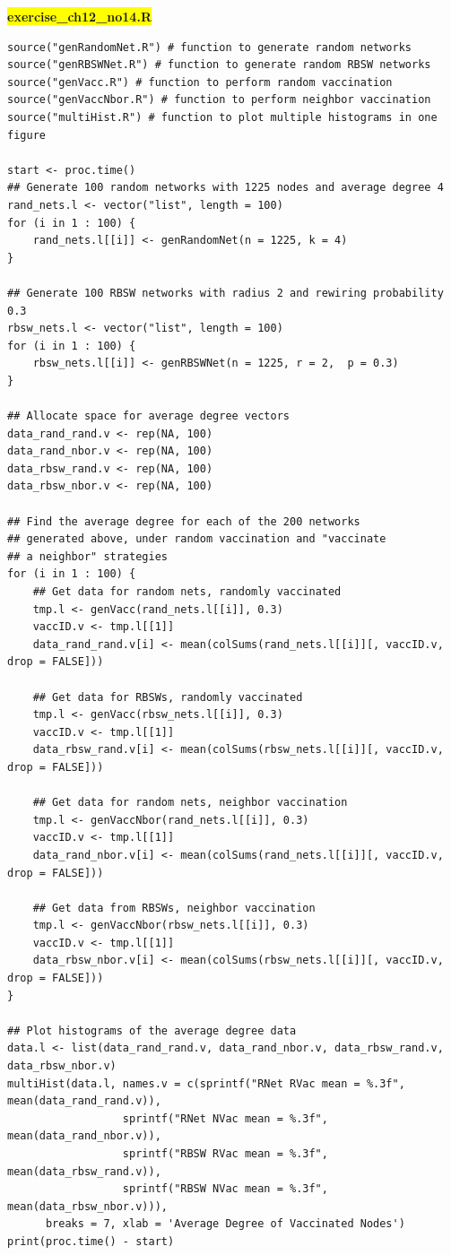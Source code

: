 \documentclass[11pt]{article}
\newcommand{\mybox}{%
    \collectbox{%
        \setlength{\fboxsep}{2pt}%
        \fbox{\BOXCONTENT}%
    }%
}
\begin{document}
\noindent\mybox{\colorbox{yellow}{\textbf{exercise\_ch12\_no14.R}}}\hspace{3mm}\hrulefill
\begin{lstlisting}
source("genRandomNet.R") # function to generate random networks
source("genRBSWNet.R") # function to generate random RBSW networks
source("genVacc.R") # function to perform random vaccination
source("genVaccNbor.R") # function to perform neighbor vaccination
source("multiHist.R") # function to plot multiple histograms in one figure

start <- proc.time()
## Generate 100 random networks with 1225 nodes and average degree 4
rand_nets.l <- vector("list", length = 100) 
for (i in 1 : 100) {
	rand_nets.l[[i]] <- genRandomNet(n = 1225, k = 4)
}

## Generate 100 RBSW networks with radius 2 and rewiring probability 0.3
rbsw_nets.l <- vector("list", length = 100)
for (i in 1 : 100) {
	rbsw_nets.l[[i]] <- genRBSWNet(n = 1225, r = 2,  p = 0.3)
}

## Allocate space for average degree vectors
data_rand_rand.v <- rep(NA, 100) 
data_rand_nbor.v <- rep(NA, 100)
data_rbsw_rand.v <- rep(NA, 100)
data_rbsw_nbor.v <- rep(NA, 100)

## Find the average degree for each of the 200 networks
## generated above, under random vaccination and "vaccinate
## a neighbor" strategies
for (i in 1 : 100) {
	## Get data for random nets, randomly vaccinated
	tmp.l <- genVacc(rand_nets.l[[i]], 0.3)	
	vaccID.v <- tmp.l[[1]]
	data_rand_rand.v[i] <- mean(colSums(rand_nets.l[[i]][, vaccID.v, drop = FALSE]))
	
	## Get data for RBSWs, randomly vaccinated	
	tmp.l <- genVacc(rbsw_nets.l[[i]], 0.3)
	vaccID.v <- tmp.l[[1]]
	data_rbsw_rand.v[i] <- mean(colSums(rbsw_nets.l[[i]][, vaccID.v, drop = FALSE]))

	## Get data for random nets, neighbor vaccination
	tmp.l <- genVaccNbor(rand_nets.l[[i]], 0.3)
	vaccID.v <- tmp.l[[1]]
	data_rand_nbor.v[i] <- mean(colSums(rand_nets.l[[i]][, vaccID.v, drop = FALSE]))
	
	## Get data from RBSWs, neighbor vaccination
	tmp.l <- genVaccNbor(rbsw_nets.l[[i]], 0.3)
	vaccID.v <- tmp.l[[1]]
	data_rbsw_nbor.v[i] <- mean(colSums(rbsw_nets.l[[i]][, vaccID.v, drop = FALSE]))
}

## Plot histograms of the average degree data
data.l <- list(data_rand_rand.v, data_rand_nbor.v, data_rbsw_rand.v, data_rbsw_nbor.v)
multiHist(data.l, names.v = c(sprintf("RNet RVac mean = %.3f", mean(data_rand_rand.v)),
			      sprintf("RNet NVac mean = %.3f", mean(data_rand_nbor.v)),
			      sprintf("RBSW RVac mean = %.3f", mean(data_rbsw_rand.v)),
			      sprintf("RBSW NVac mean = %.3f", mean(data_rbsw_nbor.v))),
	  breaks = 7, xlab = 'Average Degree of Vaccinated Nodes')
print(proc.time() - start)
\end{lstlisting}
\end{document}
